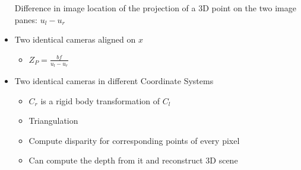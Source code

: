 \begin{itemize}
     Difference in image location of the projection of a 3D point on the two image panes: $u_l - u_r$
    \item Two identical cameras aligned on $x$
        \begin{itemize}
            \item $Z_P = \frac{bf}{u_l - u_r}$
        \end{itemize}
    \item Two identical cameras in different Coordinate Systems
        \begin{itemize}
            \item $C_r$ is a rigid body transformation of $C_l$\\
            \item Triangulation
        \end{itemize}
        \begin{itemize}
            \item Compute disparity for corresponding points of every pixel
            \item Can compute the depth from it and reconstruct 3D scene
        \end{itemize}
\end{itemize}

